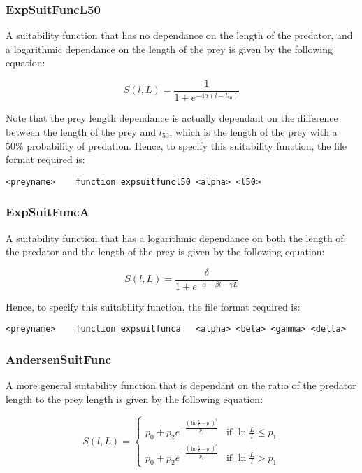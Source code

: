 \documentclass [a4paper, 10pt]{book}
\begin{document}
\subsubsection{ExpSuitFuncL50}
A suitability function that has no dependance on the length of the predator, and a logarithmic dependance on the length of the prey is given by the following equation:

\begin{equation}\label{eq:l50suit}
S(l,L) = { \frac{1}{1 + e^{ -4 \alpha ( l - l_{50} )}}}
\end{equation}

\bigskip
Note that the prey length dependance is actually dependant on the difference between the length of the prey and $l_{50}$, which is the length of the prey with a 50\% probability of predation.  Hence, to specify this suitability function, the file format required is:

\begin{verbatim}
<preyname>    function expsuitfuncl50 <alpha> <l50>
\end{verbatim}

\subsubsection{ExpSuitFuncA}
A suitability function that has a logarithmic dependance on both the length of the predator and the length of the prey is given by the following equation:

\begin{equation}\label{eq:expsuit}
S(l,L) = { \frac{\delta}{1 + e^{- \alpha - \beta l - \gamma  L}}}
\end{equation}

\bigskip
Hence, to specify this suitability function, the file format required is:

\begin{verbatim}
<preyname>    function expsuitfunca   <alpha> <beta> <gamma> <delta>
\end{verbatim}

\subsubsection{AndersenSuitFunc}
A more general suitability function that is dependant on the ratio of the predator length to the prey length is given by the following equation:

\begin{equation}\label{eq:andersensuit}
S(l,L) = 
\begin{cases}
  p_0 + p_2e^{-\frac{(\ln\frac{L}{l}-p_1)^2}{p_4}} 
  & \textrm{if $\ln\frac{L}{l} \leq p_1$}\\
  p_0 + p_2e^{-\frac{(\ln\frac{L}{l}-p_1)^2}{p_3}} 
  & \textrm{if $\ln\frac{L}{l} > p_1$}
\end{cases}
\end{equation}
\end{document}
